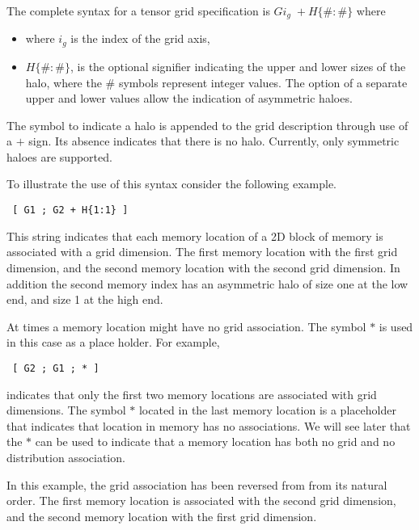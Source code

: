 The complete syntax for a tensor grid specification is $G i_g \; + H \{ \# : \# \}$ where
\begin{itemize}
	\item where $i_g$ is the index of the grid axis,
	\item $H \{ \# : \# \}$, is the optional signifier indicating the upper and lower sizes of the halo, where the $\#$ symbols represent integer values. The option of a separate upper and lower values allow the indication of asymmetric haloes.
\end{itemize}
The symbol to indicate a halo is appended to the grid description through use of a $+$ sign. Its absence indicates that there is no halo. Currently, only symmetric haloes are supported.

To illustrate the use of this syntax consider the following example.
\begin{center}
\begin{verbatim}
 [ G1 ; G2 + H{1:1} ]
\end{verbatim}
\end{center}
This string indicates that each memory location of a 2D block of memory is associated with a grid dimension. 
The first memory location with the first grid dimension, and the second memory location 
with the second grid dimension. In addition the second memory index has an asymmetric halo 
of size one at the low end, and size 1 at the high end.

At times a memory location might have no grid association. 
The symbol $\ast$ is used in this case as a place holder. For example, 
\begin{center}
\begin{verbatim}
 [ G2 ; G1 ; * ]
\end{verbatim}
\end{center}
indicates that only the first two memory locations are associated with grid dimensions. 
The symbol $\ast$ located in the last memory location is a placeholder that indicates 
that location in memory has no associations. 
We will see later that the $\ast$ can be used to indicate that a memory location 
has both no grid and no distribution association. 

In this example, the grid association has been reversed from from its natural order. 
The first memory location is associated with the second grid dimension, 
and the second memory location with the first grid dimension. 

